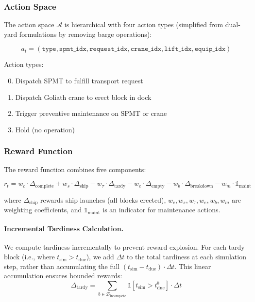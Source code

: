 \documentclass[11pt,a4paper]{article}
\begin{document}
\subsubsection{Action Space}

The action space $\mathcal{A}$ is hierarchical with four action types (simplified from dual-yard formulations by removing barge operations):

\begin{equation}
a_t = (\texttt{type}, \texttt{spmt\_idx}, \texttt{request\_idx}, \texttt{crane\_idx}, \texttt{lift\_idx}, \texttt{equip\_idx})
\end{equation}

Action types:
\begin{enumerate}
    \setcounter{enumi}{-1}
    \item Dispatch SPMT to fulfill transport request
    \item Dispatch Goliath crane to erect block in dock
    \item Trigger preventive maintenance on SPMT or crane
    \item Hold (no operation)
\end{enumerate}

\subsubsection{Reward Function}

The reward function combines five components:

\begin{equation}
r_t = w_c \cdot \Delta_{\text{complete}} + w_s \cdot \Delta_{\text{ship}} - w_\tau \cdot \Delta_{\text{tardy}} - w_e \cdot \Delta_{\text{empty}} - w_b \cdot \Delta_{\text{breakdown}} - w_m \cdot \mathbb{1}_{\text{maint}}
\end{equation}

where $\Delta_{\text{ship}}$ rewards ship launches (all blocks erected), $w_c, w_s, w_\tau, w_e, w_b, w_m$ are weighting coefficients, and $\mathbb{1}_{\text{maint}}$ is an indicator for maintenance actions.

\paragraph{Incremental Tardiness Calculation.}
We compute tardiness incrementally to prevent reward explosion. For each tardy block (i.e., where $t_{\text{sim}} > t_{\text{due}}$), we add $\Delta t$ to the total tardiness at each simulation step, rather than accumulating the full $(t_{\text{sim}} - t_{\text{due}}) \cdot \Delta t$. This linear accumulation ensures bounded rewards:
\begin{equation}
\Delta_{\text{tardy}} = \sum_{b \in \mathcal{B}_{\text{incomplete}}} \mathbb{1}[t_{\text{sim}} > t_{\text{due}}^b] \cdot \Delta t
\end{equation}
\end{document}
